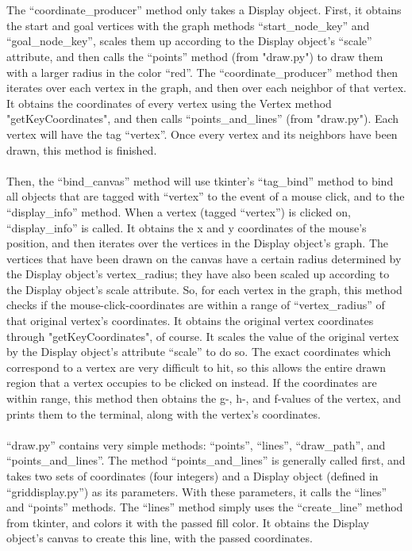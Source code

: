 \documentclass[12pt]{article}
\begin{document}
{\\
\\
The “coordinate\_producer” method only takes a Display object. First, it obtains the start and goal vertices with the graph methods “start\_node\_key” and “goal\_node\_key”, scales them up according to the Display object’s “scale” attribute, and then calls the “points” method (from "draw.py") to draw them with a larger radius in the color “red”. The “coordinate\_producer” method then iterates over each vertex in the graph, and then over each neighbor of that vertex. It obtains the coordinates of every vertex using the Vertex method "getKeyCoordinates", and then calls “points\_and\_lines” (from "draw.py"). Each vertex will have the tag “vertex”. Once every vertex and its neighbors have been drawn, this method is finished.
\\
\\
Then, the “bind\_canvas” method will use tkinter’s “tag\_bind” method to bind all objects that are tagged with “vertex” to the event of a mouse click, and to the “display\_info” method. When a vertex (tagged “vertex”) is clicked on, “display\_info” is called. It obtains the x and y coordinates of the mouse’s position, and then iterates over the vertices in the Display object’s graph. The vertices that have been drawn on the canvas have a certain radius determined by the Display object’s vertex\_radius; they have also been scaled up according to the Display object’s scale attribute. So, for each vertex in the graph, this method checks if the mouse-click-coordinates are within a range of “vertex\_radius” of that original vertex’s coordinates. It obtains the original vertex coordinates through "getKeyCoordinates", of course. It scales the value of the original vertex by the Display object's attribute “scale” to do so. The exact coordinates which correspond to a vertex are very difficult to hit, so this allows the entire drawn region that a vertex occupies to be clicked on instead. If the coordinates are within range, this method then obtains the g-, h-, and f-values of the vertex, and prints them to the terminal, along with the vertex's coordinates.
\\
\\
“draw.py” contains very simple methods: “points”, “lines”, “draw\_path”, and “points\_and\_lines”. The method “points\_and\_lines” is generally called first, and takes two sets of coordinates (four integers) and a Display object (defined in “griddisplay.py”) as its parameters. With these parameters, it calls the “lines” and “points” methods. The “lines” method simply uses the “create\_line” method from tkinter, and colors it with the passed fill color. It obtains the Display object’s canvas to create this line, with the passed coordinates.
}
\end{document}
